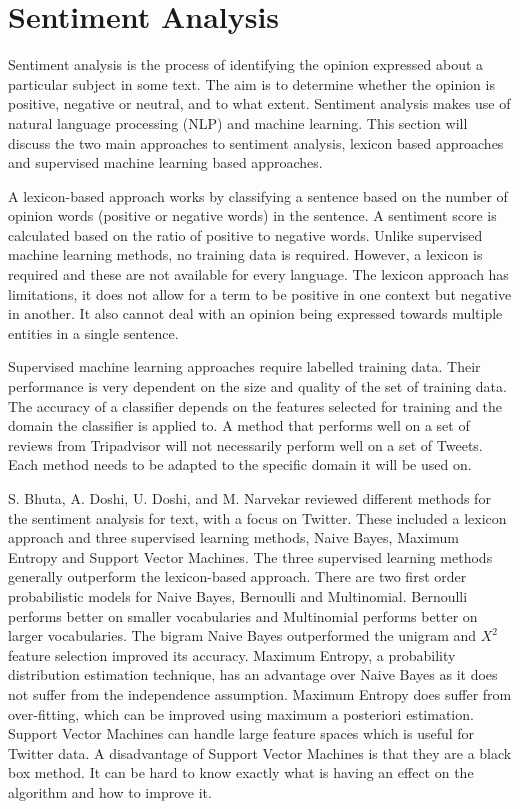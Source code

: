 \section{Sentiment Analysis}

Sentiment analysis is the process of identifying the opinion expressed about a particular subject in some text. The aim is to determine whether the opinion is positive, negative or neutral, and to what extent. Sentiment analysis makes use of natural language processing (NLP) and machine learning. This section will discuss the two main approaches to sentiment analysis, lexicon based approaches and supervised machine learning based approaches. 

A lexicon-based approach works by classifying a sentence based on the number of opinion words (positive or negative words) in the sentence. A sentiment score is calculated based on the ratio of positive to negative words. Unlike supervised machine learning methods, no training data is required. However, a lexicon is required and these are not available for every language. The lexicon approach has limitations, it does not allow for a term to be positive in one context but negative in another. It also cannot deal with an opinion being expressed towards multiple entities in a single sentence.

Supervised machine learning approaches require labelled training data. Their performance is very dependent on the size and quality of the set of training data. The accuracy of a classifier depends on the features selected for training and the domain the classifier is applied to. A method that performs well on a set of reviews from Tripadvisor will not necessarily perform well on a set of Tweets. Each method needs to be adapted to the specific domain it will be used on.

S. Bhuta, A. Doshi, U. Doshi, and M. Narvekar \cite{Bhuta2014} reviewed different methods for the sentiment analysis for text, with a focus on Twitter. These included a lexicon approach and three supervised learning methods, Naive Bayes, Maximum Entropy and Support Vector Machines. The three supervised learning methods generally outperform the lexicon-based approach. There are two first order probabilistic models for Naive Bayes, Bernoulli and Multinomial. Bernoulli performs better on smaller vocabularies and Multinomial performs better on larger vocabularies. The bigram Naive Bayes outperformed the unigram and ${X}^2$ feature selection improved its accuracy. Maximum Entropy, a probability distribution estimation technique, has an advantage over Naive Bayes as it does not suffer from the independence assumption. Maximum Entropy does suffer from over-fitting, which can be improved using maximum a posteriori estimation. Support Vector Machines can handle large feature spaces which is useful for Twitter data. A disadvantage of Support Vector Machines is that they are a black box method. It can be hard to know exactly what is having an effect on the algorithm and how to improve it.

